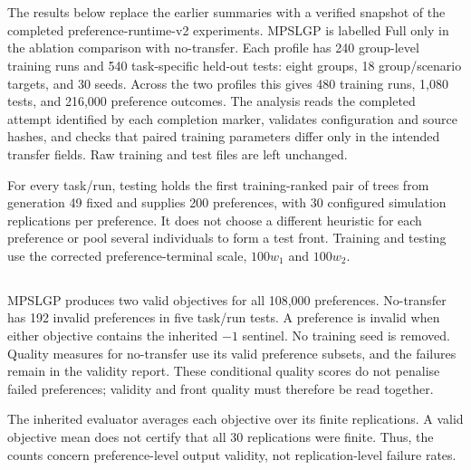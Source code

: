 \begingroup
\color{resultrevision}
\section{}
\label{sec:results}
The results below replace the earlier summaries with a verified snapshot of the completed preference-runtime-v2 experiments. MPSLGP is labelled Full only in the ablation comparison with no-transfer. Each profile has 240 group-level training runs and 540 task-specific held-out tests: eight groups, 18 group/scenario targets, and 30 seeds. Across the two profiles this gives 480 training runs, 1,080 tests, and 216,000 preference outcomes. The analysis reads the completed attempt identified by each completion marker, validates configuration and source hashes, and checks that paired training parameters differ only in the intended transfer fields. Raw training and test files are left unchanged.

For every task/run, testing holds the first training-ranked pair of trees from generation 49 fixed and supplies 200 preferences, with 30 configured simulation replications per preference. It does not choose a different heuristic for each preference or pool several individuals to form a test front. Training and testing use the corrected preference-terminal scale, $100w_1$ and $100w_2$.

\subsection{}
MPSLGP produces two valid objectives for all 108,000 preferences. No-transfer has 192 invalid preferences in five task/run tests. A preference is invalid when either objective contains the inherited $-1$ sentinel. No training seed is removed. Quality measures for no-transfer use its valid preference subsets, and the failures remain in the validity report. These conditional quality scores do not penalise failed preferences; validity and front quality must therefore be read together.

The inherited evaluator averages each objective over its finite replications. A valid objective mean does not certify that all 30 replications were finite. Thus, the counts concern preference-level output validity, not replication-level failure rates.

